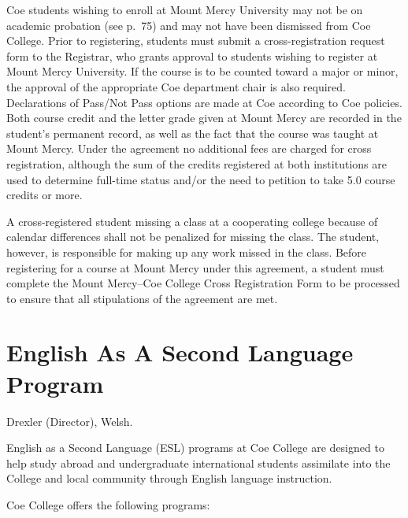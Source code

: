 \documentclass[
  letterpaper,
]{scrbook}
\begin{document}
Coe students wishing to enroll at Mount Mercy University may not be on
academic probation (see p.~75) and may not have been dismissed from Coe
College. Prior to registering, students must submit a cross-registration
request form to the Registrar, who grants approval to students wishing
to register at Mount Mercy University. If the course is to be counted
toward a major or minor, the approval of the appropriate Coe department
chair is also required. Declarations of Pass/Not Pass options are made
at Coe according to Coe policies. Both course credit and the letter
grade given at Mount Mercy are recorded in the student's permanent
record, as well as the fact that the course was taught at Mount Mercy.
Under the agreement no additional fees are charged for cross
registration, although the sum of the credits registered at both
institutions are used to determine full-time status and/or the need to
petition to take 5.0 course credits or more.

A cross-registered student missing a class at a cooperating college
because of calendar differences shall not be penalized for missing the
class. The student, however, is responsible for making up any work
missed in the class. Before registering for a course at Mount Mercy
under this agreement, a student must complete the Mount Mercy--Coe
College Cross Registration Form to be processed to ensure that all
stipulations of the agreement are met.

\section{English As A Second Language
Program}\label{english-as-a-second-language-program}

Drexler (Director), Welsh.

English as a Second Language (ESL) programs at Coe College are designed
to help study abroad and undergraduate international students assimilate
into the College and local community through English language
instruction.

Coe College offers the following programs:
\end{document}

